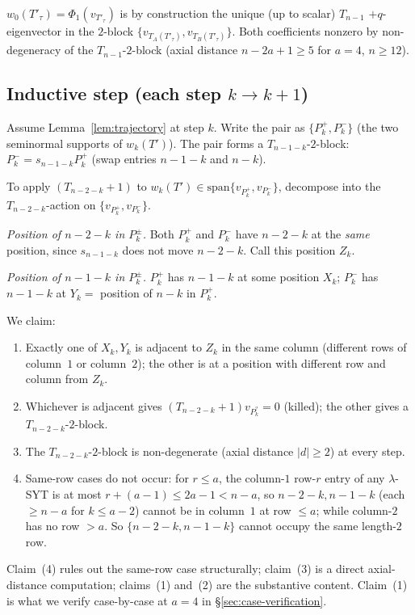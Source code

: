 \documentclass[11pt]{article}
\theoremstyle{definition}
\begin{document}
$w_0(T'_\tau)=\Phi_1(v_{T'_\tau})$ is by construction the unique
(up to scalar) $T_{n-1}$ $+q$-eigenvector in the $2$-block
$\{v_{T_A(T'_\tau)},v_{T_B(T'_\tau)}\}$.  Both coefficients nonzero by
non-degeneracy of the $T_{n-1}$-$2$-block (axial distance $n-2a+1\ge 5$
for $a=4$, $n\ge 12$).

\subsection{Inductive step (each step $k\to k+1$)}\label{sec:inductive-step}

Assume Lemma~\ref{lem:trajectory} at step $k$.  Write the pair as
$\{P_k^+,P_k^-\}$ (the two seminormal supports of $w_k(T')$).  The
pair forms a $T_{n-1-k}$-$2$-block: $P_k^-=s_{n-1-k}P_k^+$ (swap entries
$n-1-k$ and $n-k$).

To apply $(T_{n-2-k}{+}1)$ to $w_k(T')\in\mathrm{span}\{v_{P_k^+},
v_{P_k^-}\}$, decompose into the $T_{n-2-k}$-action on
$\{v_{P_k^+},v_{P_k^-}\}$.

\emph{Position of $n-2-k$ in $P_k^\pm$.}  Both $P_k^+$ and $P_k^-$ have
$n-2-k$ at the \emph{same} position, since $s_{n-1-k}$ does not move
$n-2-k$.  Call this position $Z_k$.

\emph{Position of $n-1-k$ in $P_k^\pm$.}  $P_k^+$ has $n-1-k$ at some
position $X_k$; $P_k^-$ has $n-1-k$ at $Y_k=$ position of $n-k$ in
$P_k^+$.

We claim:
\begin{enumerate}[leftmargin=2em,topsep=0.3em,itemsep=0.2em,label=\textup{(\arabic*)}]
\item Exactly one of $X_k,Y_k$ is adjacent to $Z_k$ in the same
column (different rows of column~$1$ or column~$2$); the other is at
a position with different row and column from $Z_k$.
\item Whichever is adjacent gives $(T_{n-2-k}{+}1)v_{P_k^?}=0$ (killed);
the other gives a $T_{n-2-k}$-$2$-block.
\item The $T_{n-2-k}$-$2$-block is non-degenerate (axial distance
$|d|\ge 2$) at every step.
\item Same-row cases do not occur: for $r\le a$, the column-$1$ row-$r$
entry of any $\lambda$-SYT is at most $r+(a-1)\le 2a-1<n-a$, so
$n-2-k,n-1-k$ (each $\ge n-a$ for $k\le a-2$) cannot be in column~$1$
at row $\le a$; while column-$2$ has no row $>a$.  So
$\{n-2-k,n-1-k\}$ cannot occupy the same length-$2$ row.
\end{enumerate}

Claim~(4) rules out the same-row case structurally; claim~(3) is a
direct axial-distance computation; claims~(1) and~(2) are the
substantive content.  Claim~(1) is what we verify case-by-case at
$a=4$ in \S\ref{sec:case-verification}.
\end{document}

